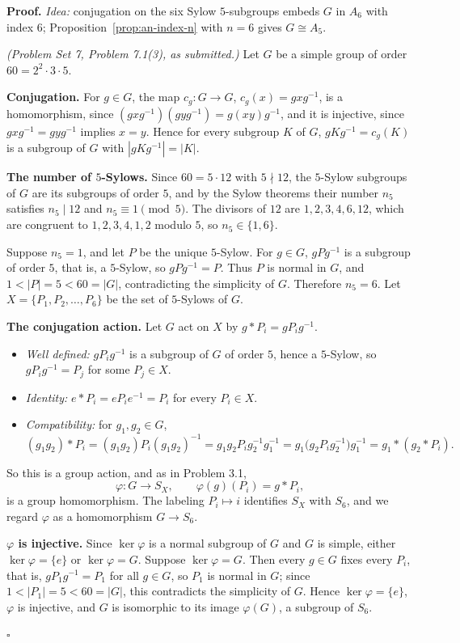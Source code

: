 \documentclass[11pt]{report}
\renewenvironment{proof}[1][Proof]{\noindent\textbf{#1.} }{\hfill$\square$\par\vspace{5pt}}
\begin{document}
\begin{proof}
\textit{Idea:} conjugation on the six Sylow $5$-subgroups embeds $G$ in $A_6$ with index $6$; Proposition~\ref{prop:an-index-n} with $n = 6$ gives $G \cong A_5$.\par
\textit{(Problem Set 7, Problem 7.1(3), as submitted.)} Let $G$ be a simple group of order $60 = 2^2 \cdot 3 \cdot 5$.

\textbf{Conjugation.} For $g \in G$, the map $c_g \colon G \to G$, $c_g(x) = gxg^{-1}$, is a homomorphism, since $(gxg^{-1})(gyg^{-1}) = g(xy)g^{-1}$, and it is injective, since $gxg^{-1} = gyg^{-1}$ implies $x = y$. Hence for every subgroup $K$ of $G$, $gKg^{-1} = c_g(K)$ is a subgroup of $G$ with $|gKg^{-1}| = |K|$.

\textbf{The number of $5$-Sylows.} Since $60 = 5 \cdot 12$ with $5 \nmid 12$, the $5$-Sylow subgroups of $G$ are its subgroups of order $5$, and by the Sylow theorems their number $n_5$ satisfies $n_5 \mid 12$ and $n_5 \equiv 1 \pmod 5$. The divisors of $12$ are $1, 2, 3, 4, 6, 12$, which are congruent to $1, 2, 3, 4, 1, 2$ modulo $5$, so $n_5 \in \{1, 6\}$.

Suppose $n_5 = 1$, and let $P$ be the unique $5$-Sylow. For $g \in G$, $gPg^{-1}$ is a subgroup of order $5$, that is, a $5$-Sylow, so $gPg^{-1} = P$. Thus $P$ is normal in $G$, and $1 < |P| = 5 < 60 = |G|$, contradicting the simplicity of $G$. Therefore $n_5 = 6$. Let $X = \{P_1, P_2, \dots, P_6\}$ be the set of $5$-Sylows of $G$.

\textbf{The conjugation action.} Let $G$ act on $X$ by $g * P_i = gP_ig^{-1}$.
\begin{itemize}
\item \emph{Well defined:} $gP_ig^{-1}$ is a subgroup of $G$ of order $5$, hence a $5$-Sylow, so $gP_ig^{-1} = P_j$ for some $P_j \in X$.
\item \emph{Identity:} $e * P_i = eP_ie^{-1} = P_i$ for every $P_i \in X$.
\item \emph{Compatibility:} for $g_1, g_2 \in G$,
\[
(g_1g_2) * P_i = (g_1g_2)P_i(g_1g_2)^{-1} = g_1g_2P_ig_2^{-1}g_1^{-1} = g_1\big(g_2P_ig_2^{-1}\big)g_1^{-1} = g_1 * (g_2 * P_i).
\]
\end{itemize}
So this is a group action, and as in Problem 3.1,
\[
\varphi \colon G \to S_X, \qquad \varphi(g)(P_i) = g * P_i,
\]
is a group homomorphism. The labeling $P_i \mapsto i$ identifies $S_X$ with $S_6$, and we regard $\varphi$ as a homomorphism $G \to S_6$.

\textbf{$\varphi$ is injective.} Since $\ker\varphi$ is a normal subgroup of $G$ and $G$ is simple, either $\ker\varphi = \{e\}$ or $\ker\varphi = G$. Suppose $\ker\varphi = G$. Then every $g \in G$ fixes every $P_i$, that is, $gP_1g^{-1} = P_1$ for all $g \in G$, so $P_1$ is normal in $G$; since $1 < |P_1| = 5 < 60 = |G|$, this contradicts the simplicity of $G$. Hence $\ker\varphi = \{e\}$, $\varphi$ is injective, and $G$ is isomorphic to its image $\varphi(G)$, a subgroup of $S_6$.


\end{proof}
\end{document}

